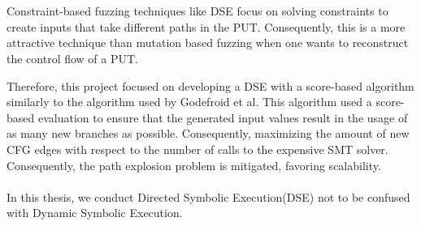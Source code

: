\documentclass{kththesis}
\begin{document}
\\ \\
Constraint-based fuzzing techniques like DSE focus on solving constraints to create inputs that take different paths in the PUT. Consequently, this is a more attractive technique than mutation based fuzzing when one wants to reconstruct the control flow of a PUT.

Therefore, this project focused on developing a DSE with a score-based algorithm similarly to the algorithm used by Godefroid et al\cite{automatedFuzzing}. This algorithm used a score-based evaluation to ensure that the generated input values result in the usage of as many new branches as possible. Consequently, maximizing the amount of new CFG edges with respect to the number of calls to the expensive SMT solver\cite{automatedFuzzing}. Consequently, the path explosion problem is mitigated, favoring scalability.
\\ \\
In this thesis, we conduct Directed Symbolic Execution(DSE) not to be confused with Dynamic Symbolic Execution.



\end{document}
